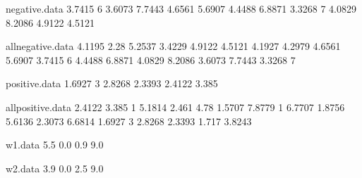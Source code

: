 \begin{filecontents}{negative.data}
3.7415	6
3.6073	7.7443
4.6561	5.6907
4.4488	6.8871
3.3268	7
4.0829	8.2086
4.9122	4.5121
\end{filecontents}

\begin{filecontents}{allnegative.data}
4.1195	2.28
5.2537	3.4229
4.9122	4.5121
4.1927	4.2979
4.6561	5.6907
3.7415	6
4.4488	6.8871
4.0829	8.2086
3.6073	7.7443
3.3268	7
\end{filecontents}

\begin{filecontents}{positive.data}
1.6927	3
2.8268	2.3393
2.4122	3.385
\end{filecontents}

\begin{filecontents}{allpositive.data}
2.4122	3.385
1	5.1814
2.461	4.78
1.5707	7.8779
1	6.7707
1.8756	5.6136
2.3073	6.6814
1.6927	3
2.8268	2.3393
1.717	3.8243
\end{filecontents}

\begin{filecontents}{w1.data}
5.5    0.0
0.9    9.0
\end{filecontents}

\begin{filecontents}{w2.data}
3.9   0.0
2.5   9.0
\end{filecontents}

\documentclass{beamer}





%
%


{
  \usetheme{Madrid}


}

